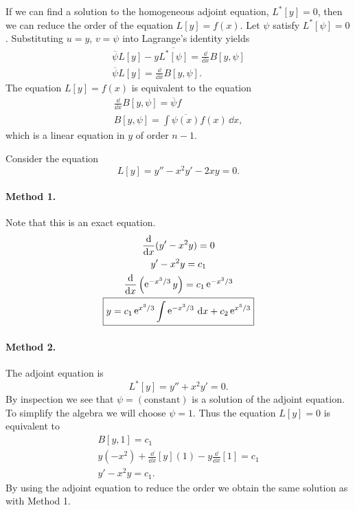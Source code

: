 If we can find a solution to the homogeneous adjoint equation, $L^*[y]=0$,
then we can reduce the order of the equation $L[y] = f(x)$.  Let $\psi$
satisfy $L^*[\psi] = 0$.  Substituting $u = y$, $v = \psi$ into 
Lagrange's identity yields
\begin{gather*}
  \overline{\psi} L[y] - y \overline{L^*[\psi]} = \frac{\dd}{\dd x} B[y, \psi] \\
  \overline{\psi} L[y] = \frac{\dd}{\dd x} B[y, \psi].
\end{gather*}
The equation $L[y] = f(x)$ is equivalent to the equation
\begin{gather*}
  \frac{\dd}{\dd x} B[y,\psi] = \overline{\psi} f \\
  B[y, \psi] = \int \overline{\psi(x)} f(x) \,\dd x,
\end{gather*}
which is a linear equation in $y$ of order $n-1$.





\begin{Example}
  Consider the equation
  \[ 
  L[y] = y'' - x^2 y' - 2x y = 0.
  \]

  \paragraph{Method 1.}
  Note that this is an exact equation.
  \begin{gather*}
    \frac{\mathrm{d}}{\mathrm{d} x} (y' - x^2 y) = 0 \\
    y' - x^2 y = c_1 \\
    \frac{\mathrm{d}}{\mathrm{d} x} \left( \mathop{\mathrm{e}}\nolimits^{-x^3/3} y \right) = c_1 \mathop{\mathrm{e}}\nolimits^{-x^3/3} \\
    \boxed{ 
      y = c_1 \mathop{\mathrm{e}}\nolimits^{x^3/3} \int \mathop{\mathrm{e}}\nolimits^{-x^3/3} \,\mathrm{d} x + c_2 \mathop{\mathrm{e}}\nolimits^{x^3/3} 
      }
  \end{gather*}

  \paragraph{Method 2.}
  The adjoint equation is
  \[ 
  L^*[y] = y'' + x^2 y' = 0.
  \]
  By inspection we see that $\psi = (\mathrm{constant})$ is a solution of the
  adjoint equation.  To simplify the algebra we will choose $\psi = 1$.
  Thus the equation $L[y] = 0$ is equivalent to
  \begin{gather*}
    B[y, 1] = c_1 \\
    y (-x^2) + \frac{\dd}{\dd x}[y](1) - y\frac{\dd}{\dd x}[1] = c_1 \\
    y' - x^2 y = c_1.
  \end{gather*}
  By using the adjoint equation to reduce the order we obtain the same solution 
  as with Method 1.
\end{Example}














